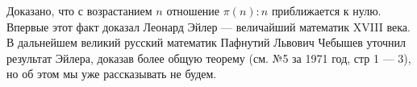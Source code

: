 \noindent
{}

\vspace{5mm}

Доказано, что с возрастанием $n$ отношение $\pi(n):n$ приближается к нулю. Впервые этот факт доказал Леонард Эйлер --- величайший математик XVIII века. В дальнейшем великий русский математик Пафнутий Львович Чебышев уточнил результат Эйлера, доказав более общую теорему (см.  №5 за 1971 год, стр 1 --- 3), но об этом мы уже рассказывать не будем.

% 